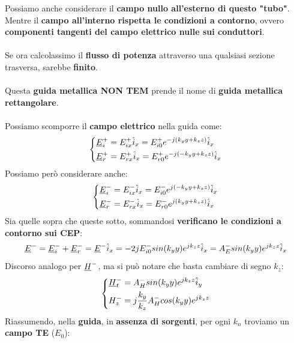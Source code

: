 Possiamo anche considerare il \textbf{campo nullo all'esterno di questo "tubo"}.\\
Mentre il \textbf{campo all'interno rispetta le condizioni a contorno}, ovvero \textbf{componenti tangenti del campo elettrico nulle sui conduttori}.\\ \\
Se ora calcolassimo il \textbf{flusso di potenza} attraverso una qualsiasi sezione trasversa, sarebbe \textbf{finito}.\\ \\
Questa \textbf{guida metallica NON TEM} prende il nome di \textbf{guida metallica rettangolare}.\\ \\
Possiamo scomporre il \textbf{campo elettrico} nella guida come:
\begin{equation*}
    \begin{dcases}
        \underline{E}^+_i = E^+_{ix} \hat{i}_x = E^+_{i0} e^{-j(k_y y + k_z z)} \hat{i}_x \\
        \underline{E}^+_r = E^+_{rx} \hat{i}_x = E^+_{r0} e^{-j(-k_y y + k_z z)} \hat{i}_x
    \end{dcases}
\end{equation*}
Possiamo però considerare anche:
\begin{equation*}
    \begin{dcases}
        \underline{E}^-_i = E^-_{ix} \hat{i}_x = E^-_{i0} e^{j(-k_y y + k_z z)} \hat{i}_x \\
        \underline{E}^-_r = E^-_{rx} \hat{i}_x = E^-_{r0} e^{j(k_y y + k_z z)} \hat{i}_x
    \end{dcases}
\end{equation*}
Sia quelle sopra che queste sotto, sommandosi \textbf{verificano le condizioni a contorno sui CEP}:
\begin{equation*}
    \underline{E}^- = \underline{E}^-_i + \underline{E}^-_r = \underline{E}^- \hat{i}_x  = -2jE^-_{i0} sin(k_y y) e^{jk_z z} \hat{i}_x = A^-_E sin(k_y y) e^{jk_z z} \hat{i}_x 
\end{equation*}
Discorso analogo per $\underline{H}^-$, ma si può notare che basta cambiare di segno $k_z$:
\begin{equation*}
    \begin{dcases}
    \underline{H}^-_t = A^-_H sin(k_y y) e^{jk_z z} \hat{i}_y\\
    H_z^- = j \frac{k_y}{k_z} A^-_H cos(k_y y) e^{jk_z z}
\end{dcases}
\end{equation*}
Riassumendo, nella \textbf{guida}, in \textbf{assenza di sorgenti}, per ogni $k_n$ troviamo un \textbf{campo TE} ($E_0$):
